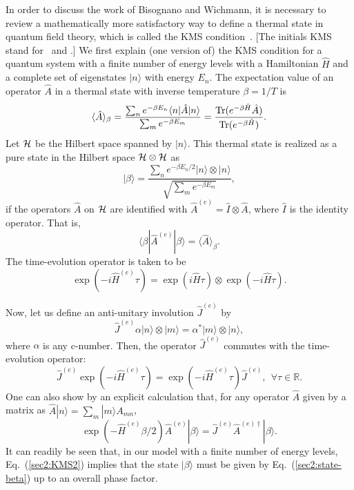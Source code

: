 \documentclass[12pt,nofootinbib,floatfix,aps,prd,showpacs,amsmath,amssymb,eqsecnum]{revtex4-2}
\begin{document}
In order to discuss the work of Bisognano and Wichmann, 
it is necessary to review a mathematically more satisfactory way to
define a thermal state in quantum field theory, which is called the KMS
condition~\cite{Haagetal67}.  [The initials KMS stand 
for~\textcite{Kubo57} and \textcite{Martinetal59}.]  
We first explain (one version of) the KMS condition 
for a quantum system with a finite number of energy levels
with a Hamiltonian $\hat{H}$ and a complete set of eigenstates
$|n\rangle$ with energy $E_n$. 
The expectation value of an operator $\hat{A}$ 
in a thermal state with inverse temperature $\beta = 1/T$ is
\begin{equation}
\langle \hat{A}\rangle_\beta = \frac{\sum_{n}e^{-\beta E_n}\langle
n|\hat{A}|n\rangle}{\sum_{m} e^{-\beta E_m}}
= \frac{{\rm Tr}(e^{-\beta \hat{H}}\hat{A})}{{\rm Tr}
( e^{-\beta \hat{H}})}.
\end{equation}
Let ${\cal H}$ be the Hilbert space spanned by $|n\rangle$.  This
thermal state is realized as a pure state in the Hilbert space
${\cal H}\otimes {\cal H}$ as 
\begin{equation}
|\beta\rangle = \frac{\sum_n e^{-\beta E_n/2}
|n\rangle \otimes |n\rangle}{\sqrt{\sum_{m}e^{-\beta E_m}}},
\label{sec2:state-beta}
\end{equation}
if the operators $\hat{A}$ on ${\cal H}$ are
identified with 
$
\hat{A}^{(e)} = \hat{I} \otimes \hat{A}
$,
where $\hat{I}$ is the identity operator.  That is,
\begin{equation}
\langle \beta|\hat{A}^{(e)}|\beta\rangle = 
\langle \hat{A}\rangle_\beta.
\end{equation}  
The time-evolution operator is taken to be
\begin{equation}
\exp(-i\hat{H}^{(e)}\tau) = 
\exp(i\hat{H}\tau)\otimes \exp(-i\hat{H}\tau). \label{sec2:extendedH}
\end{equation}

Now, let us define an anti-unitary involution $\hat{J}^{(e)}$ by
\begin{equation}
\hat{J}^{(e)}\alpha |n\rangle\otimes |m\rangle = \alpha^*|m\rangle \otimes
|n\rangle,
\end{equation}
where $\alpha$ is any c-number.  Then, the operator $\hat{J}^{(e)}$ commutes
with the time-evolution operator:
\begin{equation}
\hat{J}^{(e)}\exp(-i\hat{H}^{(e)}\tau) 
= \exp(-i\hat{H}^{(e)}\tau)\hat{J}^{(e)},\ \ \forall 
\tau\in \mathbb{R}.  \label{sec2:KMS1}
\end{equation}
One can also show by an explicit calculation that,
for any operator $\hat{A}$ given by
a matrix as $\hat{A}|n\rangle = \sum_m |m\rangle A_{mn}$,
\begin{equation}
\exp(-\hat{H}^{(e)}\beta/2)\hat{A}^{(e)}|\beta\rangle = \hat{J}^{(e)} 
\hat{A}^{(e)\dagger}|\beta\rangle.
\label{sec2:KMS2}
\end{equation}
It can readily be seen that, in our model
with a finite number of energy levels, Eq.~(\ref{sec2:KMS2})
implies that the state $|\beta\rangle$ must be given by
Eq.~(\ref{sec2:state-beta}) up to an overall phase factor.
\end{document}
